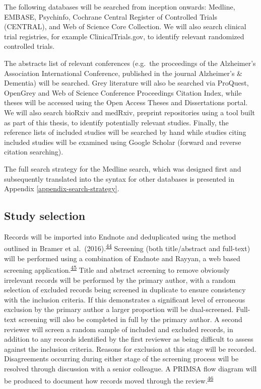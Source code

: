 \documentclass[a4paper, twoside]{templates/ociamthesis}
\begin{document}
The following databases will be searched from inception onwards: Medline, EMBASE, Psychinfo, Cochrane Central Register of Controlled Trials (CENTRAL), and Web of Science Core Collection. We will also search clinical trial registries, for example ClinicalTrials.gov, to identify relevant randomized controlled trials.

The abstracts list of relevant conferences (e.g.~the proceedings of the Alzheimer's Association International Conference, published in the journal Alzheimer's \& Dementia) will be searched. Grey literature will also be searched via ProQuest, OpenGrey and Web of Science Conference Proceedings Citation Index, while theses will be accessed using the Open Access Theses and Dissertations portal. We will also search bioRxiv and medRxiv, preprint repositories using a tool built as part of this thesis, to identify potentially relevant studies. Finally, the reference lists of included studies will be searched by hand while studies citing included studies will be examined using Google Scholar (forward and reverse citation searching).

The full search strategy for the Medline search, which was designed first and subsequently translated into the syntax for other databases is presented in Appendix \ref{appendix-search-strategy}.

\hypertarget{study-selection}{%
\subsection{Study selection}\label{study-selection}}

Records will be imported into Endnote and deduplicated using the method outlined in Bramer et al.~(2016).\textsuperscript{\protect\hyperlink{ref-bramer2016}{44}} Screening (both title/abstract and full-text) will be performed using a combination of Endnote and Rayyan, a web based screening application.\textsuperscript{\protect\hyperlink{ref-ouzzani2016}{45}} Title and abstract screening to remove obviously irrelevant records will be performed by the primary author, with a random selection of excluded records being screened in duplicate to ensure consistency with the inclusion criteria. If this demonstrates a significant level of erroneous exclusion by the primary author a larger proportion will be dual-screened. Full-text screening will also be completed in full by the primary author. A second reviewer will screen a random sample of included and excluded records, in addition to any records identified by the first reviewer as being difficult to assess against the inclusion criteria. Reasons for exclusion at this stage will be recorded. Disagreements occurring during either stage of the screening process will be resolved through discussion with a senior colleague. A PRIMSA flow diagram will be produced to document how records moved through the review.\textsuperscript{\protect\hyperlink{ref-zotero-766}{46}}
\end{document}
